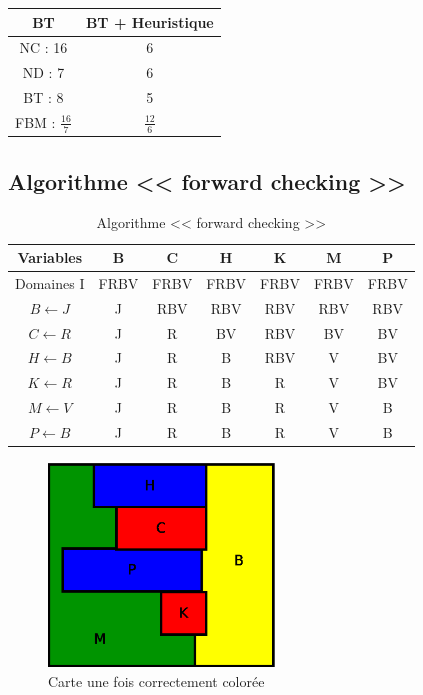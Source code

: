 \documentclass[12pt,a4paper,openany]{book}
\begin{document}
	\begin{center}
	\begin{tabular}{|c|c|}
		\hline
		BT & BT + Heuristique\\
		\hline
		NC : 16 & 6\\
		ND : 7 & 6\\
		BT : 8 & 5\\
		FBM : $\frac{16}{7}$ & $\frac{12}{6}$\\
		\hline
	\end{tabular}
\end{center}

\subsection{Algorithme << forward checking >>}
\begin{table}[H]
\centering
\begin{tabular}{c|c c c c c c}
	Variables & B & C & H& K& M& P\\
	\hline
	Domaines I & FRBV & FRBV & FRBV & FRBV &FRBV & FRBV\\
	$B\leftarrow J$ & J & RBV & RBV & RBV & RBV & RBV\\
	$C\leftarrow R$ & J & R   &  BV & RBV &  BV &  BV\\
	$H\leftarrow B$ & J & R   &  B  & RBV &   V &  BV\\
	$K\leftarrow R$ & J & R   &  B  &  R  &   V &  BV\\
	$M\leftarrow V$ & J & R   &  B  &  R  &   V &  B \\
	$P\leftarrow B$ & J & R   &  B  &  R  &   V &  B\\
\end{tabular}
\caption{Algorithme << forward checking >>}
\end{table}
\begin{figure}[H]
	\centering
	\includegraphics[width=6cm]{Diagramme16.eps}
	\caption{Carte une fois correctement colorée}
\end{figure}
\end{document}
